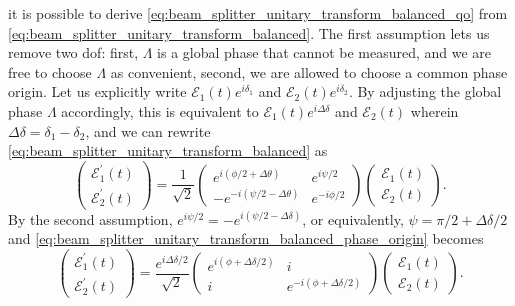 it is possible to derive \cref{eq:beam_splitter_unitary_transform_balanced_qo} from \cref{eq:beam_splitter_unitary_transform_balanced}.
The first assumption lets us remove two \gls{dof}: first, $\Lambda$ is a global phase that cannot be measured, and we are free to choose $\Lambda$ as convenient, second, we are allowed to choose a common phase origin.
Let us explicitly write $\mathcal{E}_1(t)e^{i\delta_1}$ and $\mathcal{E}_2(t)e^{i\delta_2}$.
By adjusting the global phase $\Lambda$ accordingly, this is equivalent to $\mathcal{E}_1(t)e^{i\Delta\delta}$ and $\mathcal{E}_2(t)$ wherein $\Delta\delta=\delta_1-\delta_2$, and we can rewrite \cref{eq:beam_splitter_unitary_transform_balanced} as
\begin{equation}
    \begin{pmatrix}
        \mathcal{E}_1^\prime(t)
        \\
        \mathcal{E}_2^\prime(t)
    \end{pmatrix}
    =
    \frac{1}{\sqrt{2}}
    \begin{pmatrix}
        e^{i(\phi/2+\Delta\theta)} & e^{i\psi/2}
        \\
        -e^{-i(\psi/2-\Delta\theta)} & e^{-i\phi/2}
    \end{pmatrix}
    \begin{pmatrix}
        \mathcal{E}_1(t)
        \\
        \mathcal{E}_2(t)
    \end{pmatrix}
    \label{eq:beam_splitter_unitary_transform_balanced_phase_origin}.
\end{equation}
By the second assumption, $e^{i\psi/2}=-e^{i(\psi/2-\Delta\delta)}$, or equivalently, $\psi=\pi/2+\Delta\delta/2$ and \cref{eq:beam_splitter_unitary_transform_balanced_phase_origin} becomes
\begin{equation}
    \begin{pmatrix}
        \mathcal{E}_1^\prime(t)
        \\
        \mathcal{E}_2^\prime(t)
    \end{pmatrix}
    =
    \frac{e^{i\Delta\delta/2}}{\sqrt{2}}
    \begin{pmatrix}
        e^{i(\phi+\Delta\delta/2)} & i
        \\
        i & e^{-i(\phi+\Delta\delta/2)}
    \end{pmatrix}
    \begin{pmatrix}
        \mathcal{E}_1(t)
        \\
        \mathcal{E}_2(t)
    \end{pmatrix}
    .
\end{equation}
